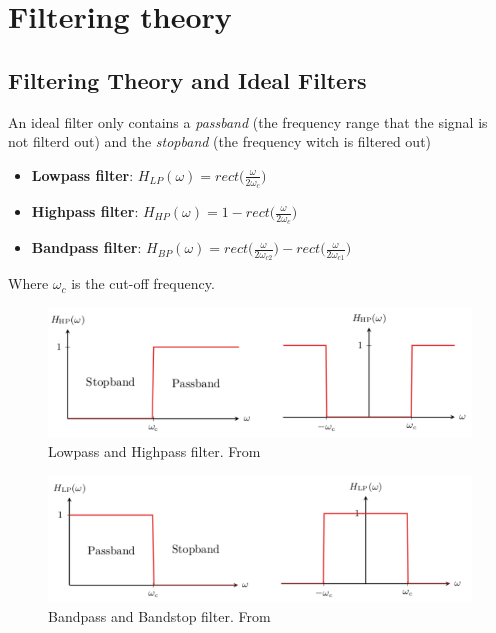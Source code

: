 
\section{Filtering theory}
\subsection{Filtering Theory and Ideal Filters}
An ideal filter only contains a \textit{passband} (the frequency range that the signal is not filterd out) 
and the \textit{stopband} (the frequency witch is filtered out)

\begin{itemize}
    \item \textbf{Lowpass filter}:
    $H_{LP}(\omega) = rect\big( \frac{\omega}{2\omega_c} \big)$
    \item \textbf{Highpass filter}:
    $H_{HP}(\omega) = 1-rect\big( \frac{\omega}{2\omega_c} \big)$
    \item \textbf{Bandpass filter}:
    $H_{BP}(\omega) = rect\big( \frac{\omega}{2\omega_{c2}} \big) - rect\big( \frac{\omega}{2\omega_{c1}} \big)$
\end{itemize}
Where $\omega_c$ is the cut-off frequency.

\begin{figure}[H]
    \centering
    \includegraphics[width=12cm]{image/filter-lp-hp.pdf}
    \caption{Lowpass and Highpass filter. From \cite{}}
    \label{fig:filter-lp-hp}
\end{figure}

\begin{figure}[H]
    \centering
    \includegraphics[width=12cm]{image/filter-bp-bs.pdf}
    \caption{Bandpass and Bandstop filter. From \cite{}}
    \label{fig:filter-bp-bs}
\end{figure}


